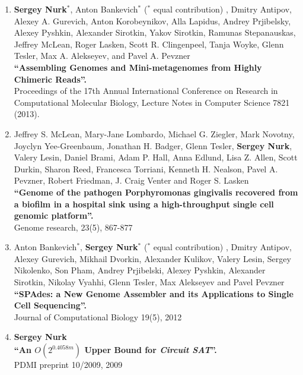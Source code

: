 \begin{enumerate}
\item \textbf{Sergey Nurk}$^*$, Anton Bankevich$^*$ ($^*$ equal contribution)%
, Dmitry Antipov, Alexey A. Gurevich, Anton Korobeynikov, Alla Lapidus, Andrey Prjibelsky, Alexey Pyshkin, Alexander Sirotkin, Yakov Sirotkin, Ramunas Stepanauskas, Jeffrey McLean, Roger Lasken, Scott R. Clingenpeel, Tanja Woyke, Glenn Tesler, Max A. Alekseyev, and Pavel A. Pevzner \\
\textbf{``Assembling Genomes and Mini-metagenomes from Highly Chimeric Reads''.} \\
Proceedings of the 17th Annual International Conference on Research in Computational Molecular Biology, Lecture Notes in Computer Science 7821 (2013).

\item Jeffrey S. McLean, Mary-Jane Lombardo, Michael G. Ziegler, Mark Novotny, Joyclyn Yee-Greenbaum, Jonathan H. Badger, Glenn Tesler, \textbf{Sergey Nurk}, Valery Lesin, Daniel Brami, Adam P. Hall, Anna Edlund, Lisa Z. Allen, Scott Durkin, Sharon Reed, Francesca Torriani, Kenneth H. Nealson, Pavel A. Pevzner, Robert Friedman, J. Craig Venter and Roger S. Lasken \\
\textbf{``Genome of the pathogen Porphyromonas gingivalis recovered from a biofilm in a hospital sink using a high-throughput single cell genomic platform''.} \\
Genome research, 23(5), 867-877

\item Anton Bankevich$^*$, \textbf{Sergey Nurk}$^*$ ($^*$ equal contribution)%
, Dmitry Antipov, Alexey Gurevich, Mikhail Dvorkin, Alexander Kulikov, Valery Lesin, Sergey Nikolenko, Son Pham, Andrey Prjibelski, Alexey Pyshkin, Alexander Sirotkin, Nikolay Vyahhi, Glenn Tesler, Max Alekseyev and Pavel Pevzner \\
\textbf{``SPAdes: a New Genome Assembler and its Applications to Single Cell Sequencing''.}\\
Journal of Computational Biology 19(5), 2012

\item \textbf{Sergey Nurk} \\
\textbf{``An $O(2^{0.4058m})$ Upper Bound for \textit{Circuit SAT}''.}\\
PDMI preprint 10/2009, 2009
\end{enumerate}

